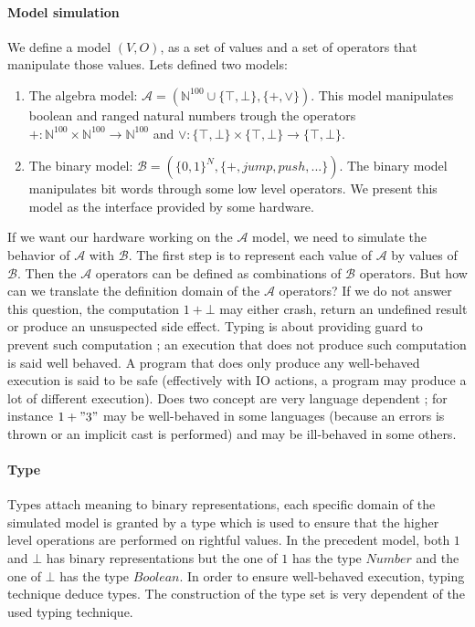 \documentclass[a4paper]{report}
\begin{document}
\paragraph{Model simulation} We define a model $(V,O)$, as a set of values and a set of operators that manipulate those values. Lets defined two models:
\begin{enumerate}
\item The algebra model: $\mathcal{A}=(\mathbb{N}^{100}\cup\{\top,\bot\},\{+,\vee\})$. This model manipulates boolean and ranged natural numbers trough the operators $+ : \mathbb{N}^{100}\times\mathbb{N}^{100}\to\mathbb{N}^{100}$ and $\vee :\{\top,\bot\}\times\{\top,\bot\}\to\{\top,\bot\}$. 
\item The binary model: $\mathcal{B}=(\{0,1\}^N,\{+,jump,push,...\})$. The binary model manipulates bit words through some low level operators. We present this model as the interface provided by some hardware.
\end{enumerate}
If we want our hardware working on the $\mathcal{A}$ model, we need to simulate the behavior of $\mathcal{A}$ with $\mathcal{B}$. The first step is to represent each value of $\mathcal{A}$ by values of $\mathcal{B}$. Then the $\mathcal{A}$ operators can be defined as combinations of $\mathcal{B}$ operators. But how can we translate the definition domain of the $\mathcal{A}$ operators? If we do not answer this question, the computation $1 + \bot$ may either crash, return an undefined result or produce an unsuspected side effect. Typing is about providing guard to prevent such computation ; an execution that does not produce such computation is said well behaved. A program that does only produce any well-behaved execution is said to be safe (effectively with IO actions, a program may produce a lot of different execution). Does two concept are very language dependent ; for instance $1 + "3"$ may be well-behaved in some languages (because an errors is thrown or an implicit cast is performed) and may be ill-behaved in some others. 

\paragraph{Type} Types attach meaning to binary representations, each specific domain of the simulated model is granted by a type which is used to ensure that the higher level operations are performed on rightful values. In the precedent model, both $1$ and $\bot$ has binary representations but the one of $1$ has the type $Number$ and the one of $\bot$ has the type $Boolean$. In order to ensure well-behaved execution, typing technique deduce types. The construction of the type set is very dependent of the used typing technique.
\end{document}
